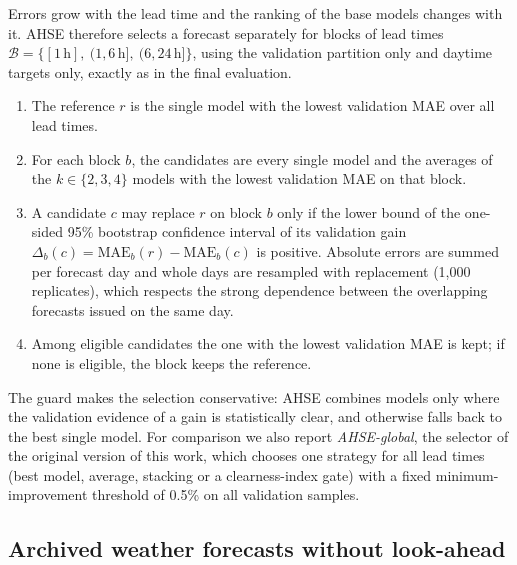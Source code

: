 Errors grow with the lead time and the ranking of the base models changes with it. AHSE
therefore selects a forecast separately for blocks of lead times
$\mathcal{B} = \{[1\,\mathrm{h}],\ (1, 6\,\mathrm{h}],\ (6, 24\,\mathrm{h}]\}$, using the
validation partition only and daytime targets only, exactly as in the final evaluation.
\begin{enumerate}
  \item The reference $r$ is the single model with the lowest validation MAE over all lead
        times.
  \item For each block $b$, the candidates are every single model and the averages of the
        $k \in \{2, 3, 4\}$ models with the lowest validation MAE on that block.
  \item A candidate $c$ may replace $r$ on block $b$ only if the lower bound of the one-sided
        95\% bootstrap confidence interval of its validation gain
        $\Delta_b(c) = \mathrm{MAE}_b(r) - \mathrm{MAE}_b(c)$ is positive. Absolute errors are
        summed per forecast day and whole days are resampled with replacement (1{,}000
        replicates), which respects the strong dependence between the overlapping forecasts
        issued on the same day.
  \item Among eligible candidates the one with the lowest validation MAE is kept; if none is
        eligible, the block keeps the reference.
\end{enumerate}
The guard makes the selection conservative: AHSE combines models only where the validation
evidence of a gain is statistically clear, and otherwise falls back to the best single model.
For comparison we also report \emph{AHSE-global}, the selector of the original version of this
work, which chooses one strategy for all lead times (best model, average, stacking or a
clearness-index gate) with a fixed minimum-improvement threshold of 0.5\% on all validation
samples.

\subsection{Archived weather forecasts without look-ahead}
\label{subsec:nwp}

